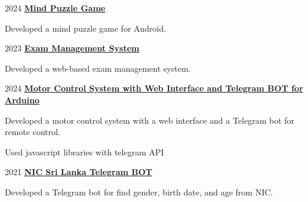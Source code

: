 \vspace{0.3 cm}

\begin{twocolentry}{
      2024
   }
   \textbf{\href{https://github.com/ShanelkaPramuditha/mind-puzzle-kotlin}{\textcolor{secondaryColor}{Mind Puzzle Game}}}
   \begin{highlights}
      \item Developed a mind puzzle game for Android.
   \end{highlights}
\end{twocolentry}

\vspace{0.3 cm}

\begin{twocolentry}{
      2023
   }
   \textbf{\href{https://github.com/ShanelkaPramuditha/oop-project-ems-portal}{\textcolor{secondaryColor}{Exam Management System}}}
   \begin{highlights}
      \item Developed a web-based exam management system.
   \end{highlights}
\end{twocolentry}

\vspace{0.3 cm}

\begin{twocolentry}{
      2024
   }
   \textbf{\href{https://github.com/ShanelkaPramuditha/arduino-motor-controller-system}{\textcolor{secondaryColor}{Motor Control System with Web Interface and Telegram BOT for Arduino}}}
   \begin{highlights}
      \item Developed a motor control system with a web interface and a Telegram bot for remote control.
      \item Used javascript libraries with telegram API
   \end{highlights}
\end{twocolentry}

\vspace{0.3 cm}

\begin{twocolentry}{
      2021
   }
   \textbf{\href{https://github.com/ShanelkaPramuditha/NIC-Sri-Lanka-BOT}{\textcolor{secondaryColor}{NIC Sri Lanka Telegram BOT}}}
   \begin{highlights}
      \item Developed a Telegram bot for find gender, birth date, and age from NIC.
   \end{highlights}
\end{twocolentry}